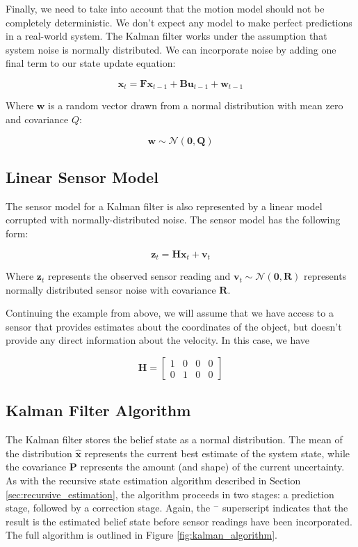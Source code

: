Finally, we need to take into account that the motion model should not
be completely deterministic.  We don't expect any model to make
perfect predictions in a real-world system.  The Kalman filter works
under the assumption that system noise is normally distributed. We can
incorporate noise by adding one final term to our state update equation:

\begin{equation}
  \mathbf{x}_t = \mathbf{F} \mathbf{x}_{t-1} + \mathbf{B} \mathbf{u}_{t-1} + \mathbf{w}_{t-1}
\end{equation}

Where $\mathbf{w}$ is a random vector drawn from a normal distribution with mean zero and covariance $Q$:

\[\mathbf{w} \sim \mathcal{N}(\mathbf{0},\mathbf{Q})\]


\subsection{Linear Sensor Model}

The sensor model for a Kalman filter is also represented by a linear
model corrupted with normally-distributed noise.  The sensor model has
the following form:

\begin{equation}
  \mathbf{z}_t = \mathbf{H} \mathbf{x}_t + \mathbf{v}_t
\end{equation}

Where $\mathbf{z}_t$ represents the observed sensor reading and 
$\mathbf{v}_t \sim \mathcal{N}(\mathbf{0},\mathbf{R})$ represents
normally distributed sensor noise with covariance $\mathbf{R}$.

Continuing the example from above, we will assume that we have access
to a sensor that provides estimates about the coordinates of the
object, but doesn't provide any direct information about the
velocity. In this case, we have

\[
\mathbf{H} = 
\begin{bmatrix}
  1& 0& 0& 0 \\
  0& 1& 0& 0
\end{bmatrix}
\]

\subsection{Kalman Filter Algorithm}

The Kalman filter stores the belief state as a normal distribution.
The mean of the distribution $\hat{\mathbf{x}}$ represents the current
best estimate of the system state, while the covariance $\mathbf{P}$
represents the amount (and shape) of the current uncertainty.  As with
the recursive state estimation algorithm described in Section
\ref{sec:recursive_estimation}, the algorithm proceeds in two stages:
a prediction stage, followed by a correction stage.  Again, the ${}^-$
superscript indicates that the result is the estimated belief state
before sensor readings have been incorporated.  The full algorithm is
outlined in Figure \ref{fig:kalman_algorithm}.


